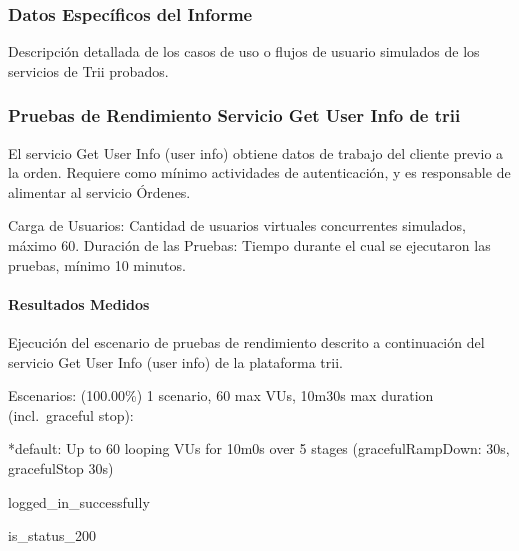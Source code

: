 \documentclass[
  paper=a4,
  ,captions=tableheading
]{scrartcl}
\renewenvironment{quote}{\begin{customblockquote}\list{}{\rightmargin=0em\leftmargin=0em}%
\item\relax\color{blockquote-text}\ignorespaces}{\unskip\unskip\endlist\end{customblockquote}}
\begin{document}
\subsubsection{Datos Específicos del
Informe}\label{sec:datos-especuxedficos-del-informe}

Descripción detallada de los casos de uso o flujos de usuario simulados
de los servicios de Trii probados.

\subsubsection{Pruebas de Rendimiento Servicio Get User Info de
trii}\label{sec:pruebas-de-rendimiento-servicio-get-user-info-de-trii}

El servicio Get User Info (user info) obtiene datos de trabajo del
cliente previo a la orden. Requiere como mínimo actividades de
autenticación, y es responsable de alimentar al servicio Órdenes.

Carga de Usuarios: Cantidad de usuarios virtuales concurrentes
simulados, máximo 60. Duración de las Pruebas: Tiempo durante el cual se
ejecutaron las pruebas, mínimo 10 minutos.

\paragraph{Resultados Medidos}\label{sec:resultados-medidos}

Ejecución del escenario de pruebas de rendimiento descrito a
continuación del servicio Get User Info (user info) de la plataforma
trii.

\begin{quote}
Escenarios: (100.00\%) 1 scenario, 60 max VUs, 10m30s max duration
(incl.~graceful stop):

*default: Up to 60 looping VUs for 10m0s over 5 stages
(gracefulRampDown: 30s, gracefulStop 30s)

logged\_in\_successfully

is\_status\_200
\end{quote}
\end{document}

